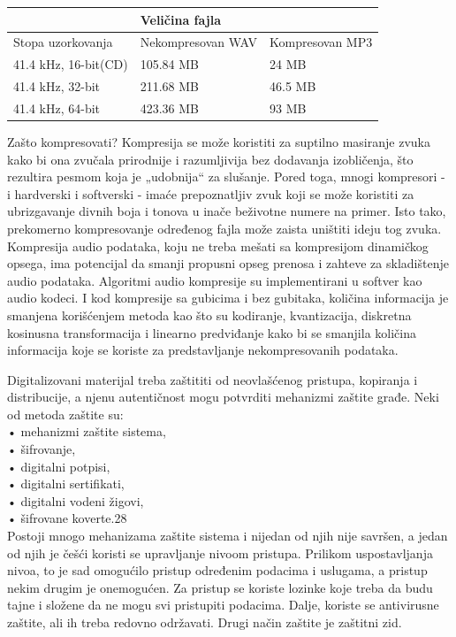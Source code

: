 \documentclass[a4paper]{article}
\begin{document}
        \begin{center}
 
    \begin{tabular}{lll} \hline
     & \textbf{Veličina fajla} & \\ \hline
    Stopa uzorkovanja & Nekompresovan WAV & Kompresovan MP3 \\ \hline
    41.4 kHz, 16-bit(CD) & 105.84 MB & 24 MB \\ \hline
    41.4 kHz, 32-bit & 211.68 MB & 46.5 MB \\ \hline
    41.4 kHz, 64-bit & 423.36 MB & 93 MB
    \end{tabular} 
        
          \end{center}

Zašto kompresovati?
Kompresija se može koristiti za suptilno masiranje zvuka kako bi ona zvučala prirodnije i razumljivija bez dodavanja izobličenja, što rezultira pesmom koja je „udobnija“ za slušanje. Pored toga, mnogi kompresori - i hardverski i softverski - imaće prepoznatljiv zvuk koji se može koristiti za ubrizgavanje divnih boja i tonova u inače beživotne numere na primer. Isto tako, prekomerno kompresovanje određenog fajla može zaista uništiti ideju tog zvuka. Kompresija audio podataka, koju ne treba mešati sa kompresijom dinamičkog opsega, ima potencijal da smanji propusni opseg prenosa i zahteve za skladištenje audio podataka. Algoritmi audio kompresije su implementirani u softver kao audio kodeci. I kod kompresije sa gubicima i bez gubitaka, količina informacija je smanjena korišćenjem metoda kao što su kodiranje, kvantizacija, diskretna kosinusna transformacija i linearno predviđanje kako bi se smanjila količina informacija koje se koriste za predstavljanje nekompresovanih podataka.    
    
Digitalizovani materijal treba zaštititi od neovlašćenog pristupa, kopiranja i
distribucije, a njenu autentičnost mogu potvrditi mehanizmi zaštite građe. Neki
od metoda zaštite su: \\
• mehanizmi zaštite sistema, \\
• šifrovanje, \\
• digitalni potpisi, \\
• digitalni sertifikati, \\
• digitalni vodeni žigovi, \\
• šifrovane koverte.28 \\
Postoji mnogo mehanizama zaštite sistema i nijedan od njih nije savršen, a jedan od njih je češći
koristi se upravljanje nivoom pristupa. Prilikom uspostavljanja nivoa, to je sad omogućilo
pristup određenim podacima i uslugama, a pristup  nekim drugim je onemogućen. Za pristup se koriste lozinke koje treba da budu tajne i složene da ne mogu svi pristupiti podacima. Dalje, koriste se antivirusne zaštite, ali ih treba redovno održavati. Drugi način zaštite je zaštitni zid.
\end{document}
